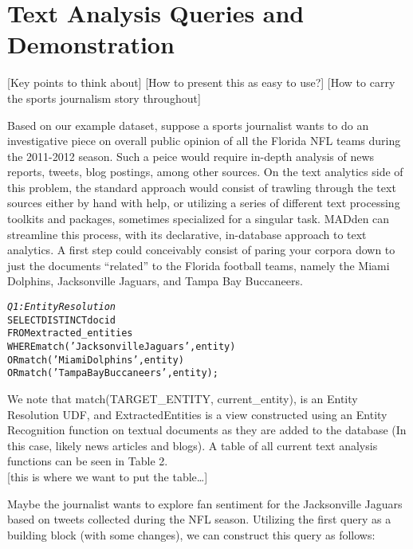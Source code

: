 \section{Text Analysis Queries and Demonstration}
[Key points to think about]
[How to present this as easy to use?]
[How to carry the sports journalism story throughout]

Based on our example dataset, suppose a sports journalist
wants to do an investigative piece on overall public opinion 
of all the Florida NFL teams during the 2011-2012 season. 
Such a peice would require in-depth analysis of news reports,
tweets, blog postings, among other sources. On the text
analytics side of this problem, the standard approach would
consist of trawling through the text sources either by hand
with help, or utilizing a series of different text processing
toolkits and packages, sometimes specialized for a singular 
task. MADden can streamline this process, with its declarative,
in-database approach to text analytics. A first step could 
conceivably consist of paring your corpora down to just
the documents ``related'' to the Florida football teams, namely
the Miami Dolphins, Jacksonville Jaguars, and Tampa Bay Buccaneers. 

\begin{small}
\begin{alltt}
\textit{Q1: Entity Resolution}
SELECT DISTINCT docid
FROM extracted_entities
WHERE match('Jacksonville Jaguars', entity)
   OR match('Miami Dolphins', entity)
   OR match('Tampa Bay Buccaneers', entity);
\end{alltt}
\end{small}

We note that match(TARGET_ENTITY, current_entity), is an Entity
Resolution UDF, and ExtractedEntities is a view constructed 
using an Entity Recognition function on textual documents as they
are added to the database (In this case, likely news articles and blogs). A
table of all current text analysis functions can be seen in Table 2.\\

[this is where we want to put the table\ldots]

Maybe the journalist wants to explore fan sentiment for the Jacksonville Jaguars
based on tweets collected during the NFL season. Utilizing the first 
query as a building block (with some changes), we can construct this 
query as follows:

